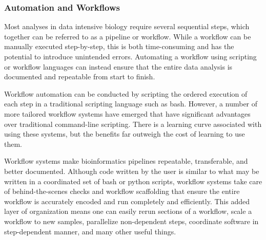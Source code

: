 \documentclass[10pt,letterpaper]{article}
\begin{document}
\subsubsection*{Automation and Workflows}
Most analyses in data intensive biology require several sequential steps, which together can be referred to as a pipeline or workflow. While a workflow can be manually executed step-by-step, this is both time-consuming and has the potential to introduce unintended errors. Automating a workflow using scripting or workflow languages can instead ensure that the entire data analysis is documented and repeatable from start to finish. 

Workflow automation can be conducted by scripting the ordered execution of each step in a traditional scripting language such as bash. However, a number of more tailored workflow systems have emerged that have significant advantages over traditional command-line scripting. There is a learning curve associated with using these systems, but the benefits far outweigh the cost of learning to use them. 



Workflow systems make bioinformatics pipelines repeatable, transferable, and better documented. Although code written by the user is similar to what may be written in a coordinated set of bash or python scripts, workflow systems take care of behind-the-scenes checks and workflow scaffolding that ensure the entire workflow is accurately encoded and run completely and efficiently. This added layer of organization means one can easily rerun sections of a workflow, scale a workflow to new samples, parallelize non-dependent steps, coordinate software in step-dependent manner, and many other useful things. 
\end{document}
